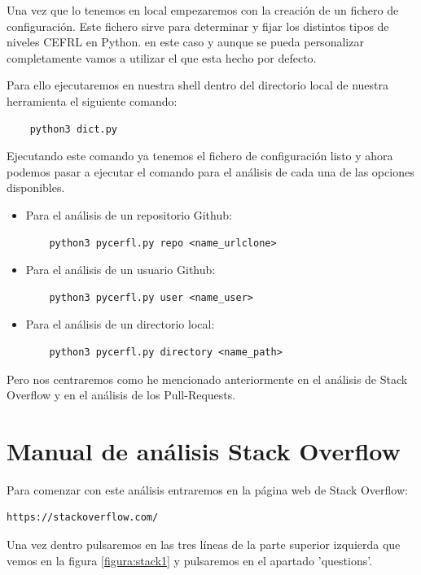 \documentclass[a4paper, 12pt]{book}
\begin{document}
Una vez que lo tenemos en local empezaremos con la creación de un fichero de configuración. Este fichero sirve para determinar y fijar los distintos tipos de niveles CEFRL en Python. en este caso y aunque se pueda personalizar completamente vamos a utilizar el que esta hecho por defecto.

Para ello ejecutaremos en nuestra shell dentro del directorio local de nuestra herramienta el siguiente comando:

\begin{verbatim}
	python3 dict.py
\end{verbatim}

Ejecutando este comando ya tenemos el fichero de configuración listo y ahora podemos pasar a ejecutar el comando para el análisis de cada una de las opciones disponibles.

\begin{itemize}
	\item Para el análisis de un repositorio Github:
	\begin{verbatim}
	python3 pycerfl.py repo <name_urlclone>
	\end{verbatim}
	\item Para el análisis de un usuario Github:
	\begin{verbatim}
	python3 pycerfl.py user <name_user>
	\end{verbatim}
	\item Para el análisis de un directorio local:
	\begin{verbatim}
	python3 pycerfl.py directory <name_path>
	\end{verbatim}
\end{itemize}

Pero nos centraremos como he mencionado anteriormente en el análisis de Stack Overflow y en el análisis de los Pull-Requests.

\section{Manual de análisis Stack Overflow}

Para comenzar con este análisis entraremos en la página web de Stack Overflow:

\begin{verbatim}
https://stackoverflow.com/
\end{verbatim}

Una vez dentro pulsaremos en las tres líneas de la parte superior izquierda que vemos en la figura \ref{figura:stack1} y pulsaremos en el apartado 'questions'.
\end{document}
